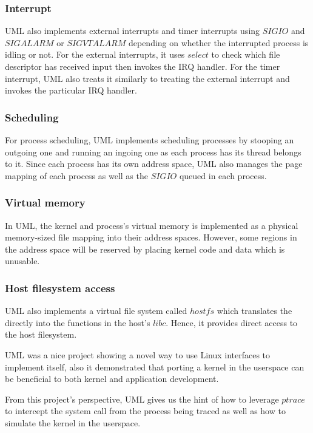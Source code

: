 \subsubsection{Interrupt}

UML also implements external interrupts and timer interrupts using $SIGIO$ and $SIGALARM$ or $SIGVTALARM$ depending on whether the interrupted process is idling or not. For the external interrupts, it uses $select$ to check which file descriptor has received input then invokes the IRQ handler. For the timer interrupt, UML also treats it similarly to treating the external interrupt and invokes the particular IRQ handler. 

\subsubsection{Scheduling}

For process scheduling, UML implements scheduling processes by stooping an outgoing one and running an ingoing one as each process has its thread belongs to it. Since each process has its own address space, UML also manages the page mapping of each process as well as the $SIGIO$ queued in each process.

\subsubsection{Virtual memory}

In UML, the kernel and process's virtual memory is implemented as a physical memory-sized file mapping into their address spaces. However, some regions in the address space will be reserved by placing kernel code and data which is unusable.

\subsubsection{Host filesystem access}

UML also implements a virtual file system called $hostfs$ which translates the directly into the functions in the host's $libc$. Hence, it provides direct access to the host filesystem.

UML was a nice project showing a novel way to use Linux interfaces to implement itself, also it demonstrated that porting a kernel in the userspace can be beneficial to both kernel and application development.

From this project's perspective, UML gives us the hint of how to leverage $ptrace$ to intercept the system call from the process being traced as well as how to simulate the kernel in the userspace.




